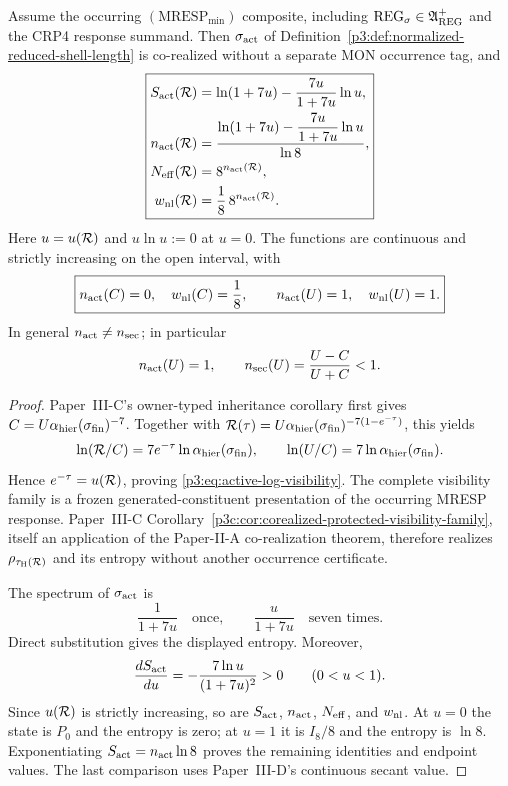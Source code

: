 \documentclass[12pt,a4paper]{article}
\begin{document}
\begin{theorem}
\label{p3:thm:index-locking}
Assume the occurring \((\mathrm{MRESP}_{\min})\) composite, including
\(\mathrm{REG}_{\sigma}\in\mathfrak A_{\rm REG}^{+}\) and the CRP4 response
summand.  Then
\(\sigma_{\rm act}\) of
Definition~\ref{p3:def:normalized-reduced-shell-length} is co-realized without
a separate MON occurrence tag, and
\begin{equation}
\label{p3:eq:entropy-index-locking-closed}
 \boxed{
 \begin{aligned}
 S_{\rm act}(\mathcal R)
 &=\ln(1+7u)
   -\frac{7u}{1+7u}\ln u,\\
 n_{\rm act}(\mathcal R)
 &=\frac{\displaystyle
      \ln(1+7u)-\frac{7u}{1+7u}\ln u}{\ln8},\\
 N_{\rm eff}(\mathcal R)&=8^{n_{\rm act}(\mathcal R)},\\
 w_{\rm nl}(\mathcal R)&=\frac18\,8^{n_{\rm act}(\mathcal R)}.
 \end{aligned}}
\end{equation}
Here \(u=u(\mathcal R)\) and \(u\ln u:=0\) at \(u=0\).  The functions are
continuous and strictly increasing on the open interval, with
\[
 \boxed{
 n_{\rm act}(C)=0,\quad w_{\rm nl}(C)=\frac18,
 \qquad
 n_{\rm act}(U)=1,\quad w_{\rm nl}(U)=1.}
\]
In general \(n_{\rm act}\ne n_{\rm sec}\); in particular
\[
 n_{\rm act}(U)=1,
 \qquad
 n_{\rm sec}(U)=\frac{U-C}{U+C}<1.
\]
\end{theorem}

\begin{proof}
Paper~III-C's owner-typed inheritance corollary first gives
\(C=U\alpha_{\rm hier}(\sigma_{\rm fin})^{-7}\).  Together with
\(\mathcal R(\tau)=U\alpha_{\rm hier}(\sigma_{\rm fin})^{-7(1-e^{-\tau})}\),
this yields
\[
 \ln(\mathcal R/C)=7e^{-\tau}\ln\alpha_{\rm hier}(\sigma_{\rm fin}),
 \qquad
 \ln(U/C)=7\ln\alpha_{\rm hier}(\sigma_{\rm fin}).
\]
Hence \(e^{-\tau}=u(\mathcal R)\), proving
\eqref{p3:eq:active-log-visibility}.  The complete visibility family is a
frozen generated-constituent presentation of the occurring MRESP response.
Paper~III-C
Corollary~\ref{p3c:cor:corealized-protected-visibility-family}, itself an
application of the Paper-II-A co-realization theorem, therefore realizes
\(\rho_{\tau_{\rm H}(\mathcal R)}\) and its entropy without another occurrence
certificate.

The spectrum of \(\sigma_{\rm act}\) is
\[
 \frac1{1+7u}\quad\text{once},\qquad
 \frac{u}{1+7u}\quad\text{seven times}.
\]
Direct substitution gives the displayed entropy.  Moreover,
\[
 \frac{dS_{\rm act}}{du}
 =-\frac{7\ln u}{(1+7u)^2}>0
 \qquad(0<u<1).
\]
Since \(u(\mathcal R)\) is strictly increasing, so are \(S_{\rm act}\),
\(n_{\rm act}\), \(N_{\rm eff}\), and \(w_{\rm nl}\).  At \(u=0\) the state
is \(P_0\) and the entropy is zero; at \(u=1\) it is \(I_8/8\) and the entropy
is \(\ln8\).  Exponentiating
\(S_{\rm act}=n_{\rm act}\ln8\) proves the remaining identities and endpoint
values.  The last comparison uses Paper~III-D's continuous secant value.
\end{proof}
\end{document}
